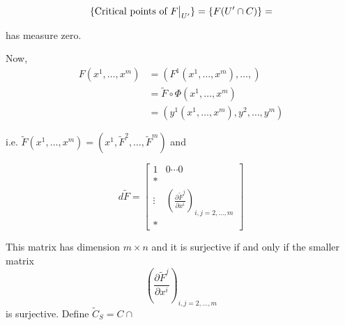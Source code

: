 \documentclass{article}
\newcommand{\restr}[2]{{%
  \left.\kern-\nulldelimiterspace %
  #1 %
  \vphantom{\big|} %
  \right|_{#2} %
  }}
\begin{document}
\[ \{\text{Critical points of } \restr{F}{U'} \} = \{F(U' \cap C)\} =  \]

has measure zero.

\vskip 0.25cm
Now, 
\begin{align*}
  F(x^1, \dots, x^m) &= \left( F^1(x^1,\dots, x^m), \dots,  \right) \\
  &= \tilde{F} \circ \Phi(x^1, \dots, x^m) \\
  &= \left( y^1 (x^1, \dots, x^m), y^2, \dots, y^m \right) 
\end{align*}

i.e. $\tilde{F}(x^1, \dots, x^m) = \left(x^1, \tilde{F}^2, \dots, \tilde{F}^m\right)$ and 

\[ d\tilde{F} = \begin{bmatrix}
  1 & 0 \cdots 0 \\
  *  \\
  \vdots & \left( \frac{\partial \tilde{F}^j}{\partial x^i} \right)_{i, j = 2, \dots, m}\\
  *
\end{bmatrix} \]

This matrix has dimension $m \times n$ and it is surjective if and only if the smaller matrix 
\[ \left( \frac{\partial \tilde{F}^j}{\partial x^i} \right)_{i, j = 2, \dots, m} \] is surjective. Define $\tilde{C}_S = C \cap $
\end{document}
